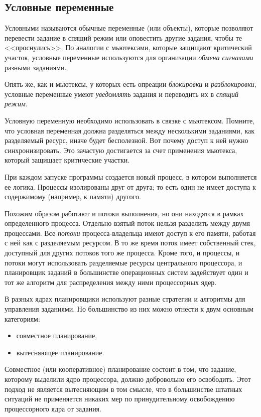 \documentclass[%
	11pt,
	a4paper,
	utf8,
		]{article}
\begin{document}
\subsection{Условные переменные}

Условными называются обычные переменные (или объекты), которые позволяют перевести задание в спящий режим или оповестить другие задания, чтобы те <<проснулись>>. По аналогии с мьютексами, которые защищают критический участок, условные переменные используются для организации \emph{обмена сигналами} разными заданиями.

Опять же, как и мьютексы, у которых есть опреации \emph{блокировки} и \emph{разблокировки}, условные переменные умеют \emph{уведомлять} задания и переводить их в \emph{спящий режим}.

Условную переменную необходимо использовать в связке с мьютексом. Помните, что условная переменная должна разделяться между несколькими заданиями, как разделяемый ресурс, иначе будет бесполезной. Вот почему доступ к ней нужно синхронизировать. Это зачастую достигается за счет применения мьютекса, который защищает критические участки.

При каждом запуске программы создается новый процесс, в котором выполняется ее логика. Процессы изолированы друг от друга; то есть один не имеет доступа к содержимому (например, к памяти) другого.

Похожим образом работают и потоки выполнения, но они находятся в рамках определенного процесса. Отдельно взятый поток нельзя разделить между двумя процессами. Все \emph{потоки} процесса-владельца имеют доступ к его памяти, работая с ней как с разделяемым ресурсом. В то же время поток имеет собственный стек, доступный для других потоков того же процесса. Кроме того, и процессы, и потоки могут использовать разделяемые ресурсы центрального процессора, и планировщик заданий в большинстве операционных систем задействует один и тот же алгоритм для распределения между ними процессорных ядер.

В разных ядрах планировщики используют разные стратегии и алгоритмы для управления заданиями. Но большинство из них можно отнести к двум основным категориям:
\begin{itemize}
	\item совместное планирование,
	
	\item вытесняющее планирование.
\end{itemize}

Совместное (или кооперативное) планирование состоит в том, что задание, которому выделили ядро процессора, должно добровольно его освободить. Этот подход не является вытесняющим в том смысле, что в большинстве штатных ситуаций не применяется никаких мер по принудительному освобождению процессорного ядра от задания.
\end{document}
